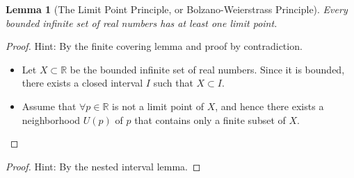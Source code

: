 \documentclass[onecolumn]{ctexart}
\newtheorem{lemma}{Lemma}
\begin{document}
\begin{lemma}[The Limit Point Principle, or Bolzano-Weierstrass Principle]
  Every bounded infinite set of real numbers has at least one limit point.
\end{lemma}
\begin{proof}
  Hint: By the finite covering lemma and proof by contradiction.
  \begin{itemize}
    \item Let $X \subset \mathbb{R}$ be the bounded infinite set of real numbers.
    Since it is bounded, there exists a closed interval $I$ such that $X \subset 
    I$.
    \item Assume that $\forall p \in \mathbb{R}$ is not a limit point of $X$, and 
    hence there exists a neighborhood $U(p)$ of $p$ that contains only a finite 
    subset of $X$.
  \end{itemize}
\end{proof}
\begin{proof}
  Hint: By the nested interval lemma.
\end{proof}
\end{document}
